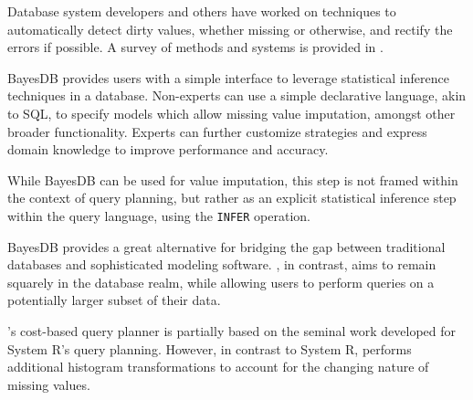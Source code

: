 Database system developers and others have worked on techniques to automatically
detect dirty values, whether missing or otherwise, and rectify the errors if
possible. A survey of methods and systems is provided in
\cite{hellerstein2008quantitative}.

BayesDB \cite{mansinghka2015bayesdb} provides users with a simple interface to 
leverage statistical inference techniques in a database. Non-experts
can use a simple declarative language, akin to SQL, to specify models
which allow missing value imputation, amongst other broader functionality.
Experts can further customize strategies and express domain knowledge to
improve performance and accuracy.

While BayesDB can be used for value imputation, this step is not framed
within the context of query planning, but rather as an explicit statistical
inference step within the query language, using the \verb|INFER| operation. 

BayesDB provides a great alternative for bridging the gap between
traditional databases and sophisticated modeling software. \ProjectName{}, in
contrast, aims to remain squarely in the database realm, while allowing
users to perform queries on a potentially larger subset of their data.

\ProjectName's cost-based query planner 
is partially based on the seminal work developed for System R's query planning\cite{blasgen1981system}.
However, in contrast to System R, \ProjectName{} performs additional histogram transformations to account
for the changing nature of missing values.





